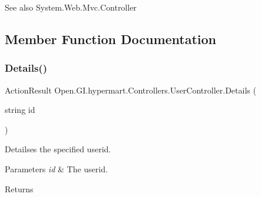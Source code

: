 \begin{DoxySeeAlso}{See also}
System.\+Web.\+Mvc.\+Controller


\end{DoxySeeAlso}


\subsection{Member Function Documentation}
\hypertarget{class_open_1_1_g_i_1_1hypermart_1_1_controllers_1_1_user_controller_a4627a7a94b713760f00050bac936a54f}{}\label{class_open_1_1_g_i_1_1hypermart_1_1_controllers_1_1_user_controller_a4627a7a94b713760f00050bac936a54f} 
\subsubsection{\texorpdfstring{Details()}{Details()}}
{\footnotesize\ttfamily Action\+Result Open.\+G\+I.\+hypermart.\+Controllers.\+User\+Controller.\+Details (\begin{DoxyParamCaption}\item[{string}]{id }\end{DoxyParamCaption})}



Detailses the specified userid. 


\begin{DoxyParams}{Parameters}
{\em id} & The userid.\\
\hline
\end{DoxyParams}
\begin{DoxyReturn}{Returns}

\end{DoxyReturn}
\hypertarget{class_open_1_1_g_i_1_1hypermart_1_1_controllers_1_1_user_controller_a3168162b86edbdbd30a593fa6aca8e9f}{}\label{class_open_1_1_g_i_1_1hypermart_1_1_controllers_1_1_user_controller_a3168162b86edbdbd30a593fa6aca8e9f} 
